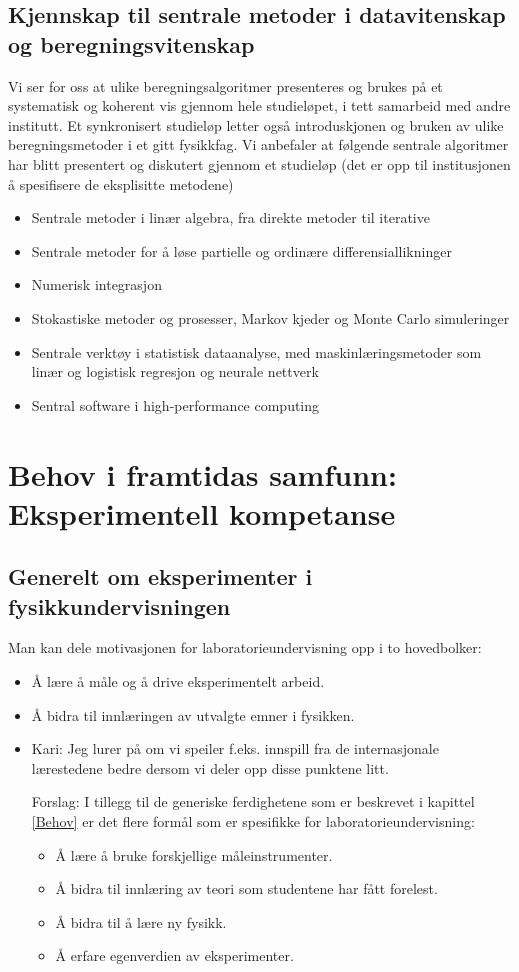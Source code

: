 \documentclass{article}
\begin{document}
\subsection{Kjennskap til sentrale metoder i datavitenskap og beregningsvitenskap}
Vi ser for oss at ulike beregningsalgoritmer presenteres og brukes på et systematisk og koherent vis gjennom hele studieløpet, i tett samarbeid med andre institutt. Et synkronisert studieløp letter også introduskjonen og bruken av ulike beregningsmetoder i et gitt fysikkfag. 
Vi anbefaler at følgende sentrale algoritmer har blitt presentert og diskutert gjennom et studieløp (det er opp til institusjonen å spesifisere de eksplisitte metodene)
\begin{itemize}
  \item Sentrale metoder i linær algebra, fra direkte metoder til iterative
  \item Sentrale metoder for å løse partielle og ordinære differensiallikninger
  \item Numerisk integrasjon
  \item Stokastiske metoder og prosesser, Markov kjeder og Monte Carlo simuleringer 
  \item Sentrale verktøy i statistisk dataanalyse, med maskinlæringsmetoder som linær og logistisk regresjon og neurale nettverk
  \item Sentral software i high-performance computing 
\end{itemize}

\section{Behov i framtidas samfunn: Eksperimentell kompetanse}

\subsection{Generelt om eksperimenter i fysikkundervisningen}
Man kan dele motivasjonen for laboratorieundervisning opp i to hovedbolker:
\begin{itemize}
    \item Å lære å måle og å drive eksperimentelt arbeid.
    \item Å bidra til innlæringen av utvalgte emner i
    fysikken.
    \item {\color{red}Kari: Jeg lurer på om vi speiler f.eks. innspill fra de internasjonale lærestedene bedre dersom vi deler opp disse punktene litt. 
    
    Forslag:
    I tillegg til de generiske ferdighetene som er beskrevet i kapittel \ref{Behov} er det flere formål som er spesifikke for laboratorieundervisning:  
    \begin{itemize}
    \item Å lære å bruke forskjellige måleinstrumenter.
    \item Å bidra til innlæring av teori som studentene har fått forelest. 
    \item Å bidra til å lære ny fysikk.
    \item Å erfare egenverdien av eksperimenter.
    \end{itemize}}
\end{itemize}
\end{document}
